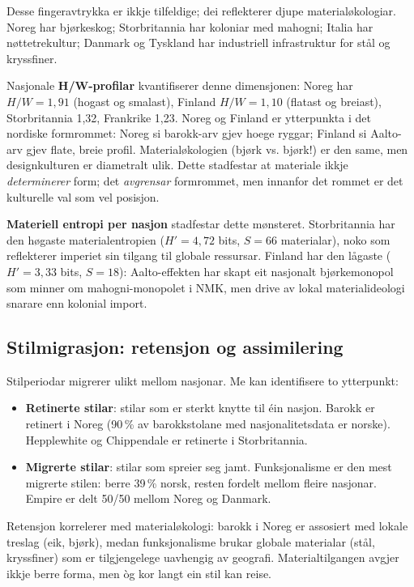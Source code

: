 \documentclass[10pt, a4paper, twocolumn]{article}
\begin{document}
Desse fingeravtrykka er ikkje tilfeldige; dei reflekterer djupe materialøkologiar. Noreg har bjørkeskog; Storbritannia har koloniar med mahogni; Italia har nøttetrekultur; Danmark og Tyskland har industriell infrastruktur for stål og kryssfiner.

Nasjonale \textbf{H/W-profilar} kvantifiserer denne dimensjonen: Noreg har $H/W = 1{,}91$ (hogast og smalast), Finland $H/W = 1{,}10$ (flatast og breiast), Storbritannia 1,32, Frankrike 1,23. Noreg og Finland er ytterpunkta i det nordiske formrommet: Noreg si barokk-arv gjev hoege ryggar; Finland si Aalto-arv gjev flate, breie profil. Materialøkologien (bjørk vs. bjørk!) er den same, men designkulturen er diametralt ulik. Dette stadfestar at materiale ikkje \emph{determinerer} form; det \emph{avgrensar} formrommet, men innanfor det rommet er det kulturelle val som vel posisjon.

\textbf{Materiell entropi per nasjon} stadfestar dette mønsteret. Storbritannia har den høgaste materialentropien ($H' = 4{,}72$ bits, $S = 66$ materialar), noko som reflekterer imperiet sin tilgang til globale ressursar. Finland har den lågaste ($H' = 3{,}33$ bits, $S = 18$): Aalto-effekten har skapt eit nasjonalt bjørkemonopol som minner om mahogni-monopolet i NMK, men drive av lokal materialideologi snarare enn kolonial import.

\subsection{Stilmigrasjon: retensjon og assimilering}

Stilperiodar migrerer ulikt mellom nasjonar. Me kan identifisere to ytterpunkt:

\begin{itemize}
  \item \textbf{Retinerte stilar}: stilar som er sterkt knytte til éin nasjon. Barokk er retinert i Noreg (90\,\% av barokkstolane med nasjonalitetsdata er norske). Hepplewhite og Chippendale er retinerte i Storbritannia.
  \item \textbf{Migrerte stilar}: stilar som spreier seg jamt. Funksjonalisme er den mest migrerte stilen: berre 39\,\% norsk, resten fordelt mellom fleire nasjonar. Empire er delt 50/50 mellom Noreg og Danmark.
\end{itemize}

Retensjon korrelerer med materialøkologi: barokk i Noreg er assosiert med lokale treslag (eik, bjørk), medan funksjonalisme brukar globale materialar (stål, kryssfiner) som er tilgjengelege uavhengig av geografi. Materialtilgangen avgjer ikkje berre forma, men òg kor langt ein stil kan reise.
\end{document}

